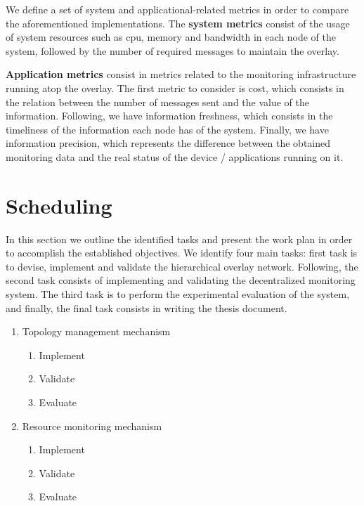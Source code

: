 We define a set of system and applicational-related metrics in order to compare the aforementioned implementations. The \textbf{system metrics} consist of the usage of system resources such as cpu, memory and bandwidth in each node of the system, followed by the number of required messages to maintain the overlay.

\textbf{Application metrics} consist in metrics related to the monitoring infrastructure running atop the overlay. The first metric to consider is cost, which consists in the relation between the number of messages sent and the value of the information. Following, we have information freshness, which consists in the timeliness of the information each node has of the system. Finally, we have information precision, which represents the difference between the obtained monitoring data and the real status of the device / applications running on it.  

\section{Scheduling}

In this section we outline the identified tasks and present the work plan in order to accomplish the established objectives. We identify four main tasks: first task is to devise, implement and validate the hierarchical overlay network. Following, the second task consists of implementing and validating the decentralized monitoring system. The third task is to perform the experimental evaluation of the system, and finally, the final task consists in writing the thesis document.

\begin{enumerate}
    \item Topology management mechanism
    \begin{enumerate}
        \item Implement
        \item Validate
        \item Evaluate
    \end{enumerate}

    \item Resource monitoring mechanism
    \begin{enumerate}
        \item Implement
        \item Validate
        \item Evaluate
    \end{enumerate}
    
\end{enumerate}








